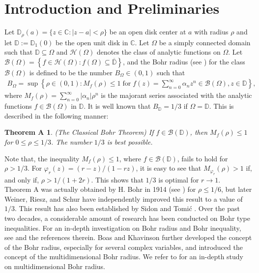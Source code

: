 \documentclass[11pt,reqno]{amsart}
\newtheorem*{theoA}{Theorem A}
\newtheorem{open problem}{Open problem}[section]
\newcommand{\ol}{\overline}
\newcommand{\beas}{\begin{eqnarray*}}
\newcommand{\eeas}{\end{eqnarray*}}
\numberwithin{equation}{section}
\begin{document}
\section{Introduction and Preliminaries}
Let $\mathbb{D}_{\rho}(a)=\{z\in\mathbb{C}:|z-a|<\rho\}$ be an open disk center at $a$ with radius $\rho$ and let $\mathbb{D} := \mathbb{D}_1(0)$ be the open unit disk in $\mathbb{C}$. 
Let $\Omega$ be a simply connected domain such that $\mathbb{D}\subseteq \Omega$ and $\mathcal{H}(\Omega)$ denotes the class of analytic functions on $\Omega$. Let $\mathcal{B}(\Omega)=\left\{f \in \mathcal{H}(\Omega): f(\Omega)\subseteq \ol{\mathbb{D}}\right\}$, and the Bohr radius (see \cite{10}) for the class $\mathcal{B}(\Omega)$ is defined to be the number $B_\Omega\in (0, 1)$ such that 
 \beas B_\Omega=\sup\left\{\rho\in (0,1):M_f(\rho)\leq 1\;\text{for} \;f(z)=\sum_{n=0}^{\infty}\alpha_nz^n\in\mathcal{B}(\Omega),z\in\mathbb{D}\right\},\eeas 
where $M_f(\rho)=\sum_{n=0}^{\infty}|\alpha_n|\rho^n$ is the majorant series associated with the analytic functions $f\in\mathcal{B}(\Omega)$ in $\mathbb{D}$. 
It is well known that $B_{\mathbb{D}} = 1/3$ if $\Omega=\mathbb{D}$. This is described in the following manner:
\begin{theoA} (The Classical Bohr Theorem) If $f\in\mathcal{B}(\mathbb{D})$, then $M_f (\rho) \leq 1$ for $0 \leq \rho \leq 1/3$. The number $1/3$ is best possible.
\end{theoA}
Note that, the inequality $M_f (\rho) \leq 1$, where $f\in\mathcal{B}(\mathbb{D})$, fails to hold for $\rho > 1/3$.
For $\varphi_r(z) = (r - z)/(1 - rz)$, it is easy to see that $M_{\varphi_r} (\rho)>1$ if, and only if, $\rho>1/(1+2r)$. This shows that $1/3$ is optimal for $r\to1$.\\[2mm]
\indent \textrm{Theorem A} was actually obtained by H. Bohr in 1914 (see \cite{5}) for $\rho \leq 1/6$, but  later Weiner, Riesz, and Schur \cite{8a} have independently improved 
this result to a value of $1/3$. 
This result has also been established by Sidon \cite{28} and Tomi\'c \cite{30}. Over the past two decades, a considerable amount of research has been conducted on Bohr type 
inequalities. For an in-depth investigation on Bohr radius and Bohr inequality, see \cite{1,2,301,302,303,304,305,4,8,12,306,307,14,16,308,R1} and the references therein. 
Boas and Khavinson \cite{7} further developed the concept of the Bohr radius, especially for several complex variables, and introduced the concept of the multidimensional Bohr 
radius. We refer to \cite{3,V1,V2,21a} for an in-depth study on multidimensional Bohr radius.\\[2mm]
\end{document}
